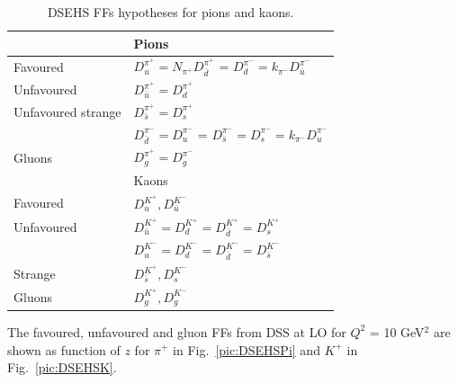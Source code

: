 \begin{table}[!h]
  \caption{DSEHS FFs hypotheses for pions and kaons.}
  \label{tab:DSEHSParametrization}
  \centering
  \begin{tabular}{ll}
    \hline
    \hline
     & Pions \\
    \hline
    Favoured & $D^{\pi^{+}}_{u} = N_{\pi^{+}} D^{\pi^{+}}_{\bar{d}}$ = $D^{\pi^{-}}_{d} = k_{\pi^{-}} D^{\pi^{-}}_{\bar{u}}$ \\
    Unfavoured & $D^{\pi^{+}}_{\bar{u}} = D^{\pi^{+}}_{d}$ \\
    Unfavoured strange & $D^{\pi^{+}}_{\bar{s}} = D^{\pi^{+}}_{s}$ \\
     & $D^{\pi^{-}}_{\bar{d}} = D^{\pi^{-}}_{u}$ = $D^{\pi^{-}}_{\bar{s}} = D^{\pi^{-}}_{s} = k_{\pi^{-}} D^{\pi^{-}}_{u}$ \\
    Gluons & $D^{\pi^{+}}_{g} = D^{\pi^{-}}_{g}$ \\
    \hline
    \hline
     & Kaons \\
    \hline
    Favoured & $D^{K^{+}}_{u}, D^{K^{-}}_{\bar{u}}$ \\
    Unfavoured & $D^{K^{+}}_{\bar{u}} = D^{K^{+}}_{d} = D^{K^{+}}_{\bar{d}} = D^{K^{+}}_{s}$ \\
               & $D^{K^{-}}_{u} = D^{K^{-}}_{d} = D^{K^{-}}_{\bar{d}} = D^{K^{-}}_{\bar{s}}$ \\
    Strange & $D^{K^{+}}_{\bar{s}}, D^{K^{-}}_{s}$ \\
    Gluons & $D^{K^{+}}_{g}, D^{K^{-}}_{g}$ \\
  \end{tabular}
\end{table}

The favoured, unfavoured and gluon FFs from DSS at LO for $Q^2$ = 10 GeV$^2$ are shown as function of $z$ for $\pi^+$ in Fig.~\ref{pic:DSEHSPi} and $K^+$ in Fig.~\ref{pic:DSEHSK}.


